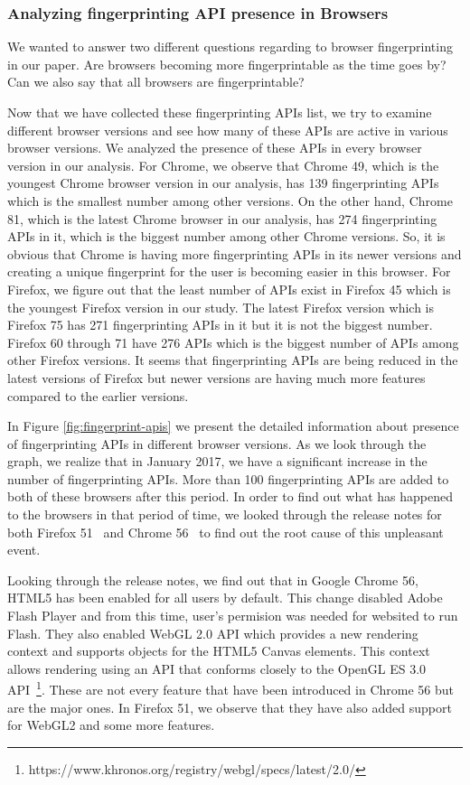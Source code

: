 
\subsubsection{Analyzing fingerprinting API presence in Browsers}
We wanted to answer two different questions regarding to browser fingerprinting in our paper. Are browsers becoming more fingerprintable as the time goes by? Can we also say that all browsers are fingerprintable?

Now that we have collected these fingerprinting APIs list, we try to examine different browser versions and see how many of these APIs are active in various browser versions.
We analyzed the presence of these APIs in every browser version in our analysis. For Chrome, we observe that Chrome 49, which is the youngest Chrome browser version in our analysis, has 139 fingerprinting APIs which is the smallest number among other versions.
On the other hand, Chrome 81, which is the latest Chrome browser in our analysis, has 274 fingerprinting APIs in it, which is the biggest number among other Chrome versions. So, it is obvious that Chrome is having more fingerprinting APIs in its newer versions and creating a unique fingerprint for the user is becoming easier in this browser. 
For Firefox, we figure out that the least number of APIs exist in Firefox 45 which is the youngest Firefox version in our study. The latest Firefox version which is Firefox 75 has 271 fingerprinting APIs in it but it is not the biggest number. Firefox 60 through 71 have 276 APIs which is the biggest number of APIs among other Firefox versions. It seems that fingerprinting APIs are being reduced in the latest versions of Firefox but newer versions are having much more features compared to the earlier versions.

In Figure \ref{fig:fingerprint-apis} we present the detailed information about presence of fingerprinting APIs in different browser versions. As we look through the graph, we realize that in January 2017, we have a significant increase in the number of fingerprinting APIs. More than 100 fingerprinting APIs are added to both of these browsers after this period. In order to find out what has happened to the browsers in that period of time, we looked through the release notes for both Firefox 51~\cite{firefox-51-notes} and Chrome 56~\cite{chrome-56-notes} to find out the root cause of this unpleasant event. 

Looking through the release notes, we find out that in Google Chrome 56, HTML5 has been enabled for all users by default. This change disabled Adobe Flash Player and from this time, user's permision was needed for websited to run Flash. They also enabled WebGL 2.0 API which provides a new rendering context and supports objects for the HTML5 Canvas elements. This context allows rendering using an API that conforms closely to the OpenGL ES 3.0 API~\footnote{https://www.khronos.org/registry/webgl/specs/latest/2.0/}. These are not every feature that have been introduced in Chrome 56 but are the major ones. In Firefox 51, we observe that they have also added support for WebGL2 and some more features.

